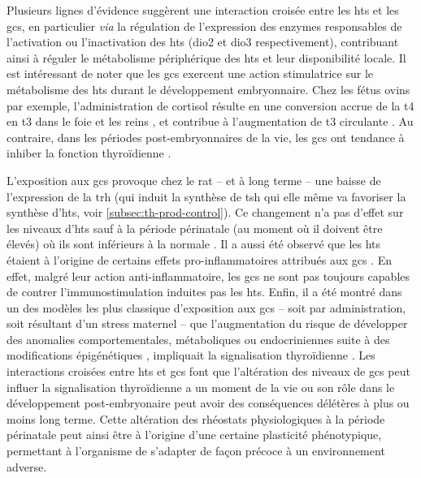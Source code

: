 \documentclass[../main.tex]{subfiles}
\begin{document}
Plusieurs lignes d'évidence suggèrent une interaction croisée entre les \glspl{ht} et les \glspl{gc}, en particulier \textit{via} la régulation de l'expression des enzymes responsables de l'activation ou l'inactivation des \glspl{ht} (\gls{dio2} et \gls{dio3} respectivement), contribuant ainsi à réguler le métabolisme périphérique des \glspl{ht} et leur disponibilité locale.
Il est intéressant de noter que les \glspl{gc} exercent une action stimulatrice sur le métabolisme des \glspl{ht} durant le développement embryonnaire.
Chez les fétus ovins par exemple, l'administration de cortisol résulte en une conversion accrue de la \gls{t4} en \gls{t3} dans le foie et les reins \citep{Wu1978}, et contribue à l'augmentation de \gls{t3} circulante \citep{Darras1996}.
Au contraire, dans les périodes post-embryonnaires de la vie, les \glspl{gc} ont tendance à inhiber la fonction thyroïdienne \citep{Chopra1975,Decuypere1983,Bianco1987}.
\par
L'exposition aux \glspl{gc} provoque chez le rat – et à long terme – une baisse de l'expression de la \gls{trh} (qui induit la synthèse de \gls{tsh} qui elle même va favoriser la synthèse d'\glspl{ht}, voir \autoref{subsec:th-prod-control}).
Ce changement n'a pas d'effet sur les niveaux d'\glspl{ht} sauf à la période périnatale (au moment où il doivent être élevés) où ils sont inférieurs à la normale \citep{Carbone2012}.
Il a aussi été observé que les \glspl{ht} étaient à l'origine de certains effets pro-inflammatoires attribués aux \glspl{gc} \citep{Montesinos2012}.
En effet, malgré leur action anti-inflammatoire, les \glspl{gc} ne sont pas toujours capables de contrer l'immunostimulation induites pas les \glspl{ht}.
Enfin, il a été montré dans un des modèles les plus classique d'exposition aux \glspl{gc} – soit par administration, soit résultant d'un stress maternel – que l'augmentation du risque de développer des anomalies comportementales, métaboliques ou endocriniennes suite à des modifications épigénétiques \cite{Weaver2004}, impliquait la signalisation thyroïdienne \citep{Hellstrom2012}.
Les interactions croisées entre \glspl{ht} et \glspl{gc} font que l'altération des niveaux de \glspl{gc} peut influer la signalisation thyroïdienne a un moment de la vie ou son rôle dans le développement post-embryonaire peut avoir des conséquences délétères à plus ou moins long terme.
Cette altération des rhéostats physiologiques à la période périnatale peut ainsi être à l'origine d'une certaine plasticité phénotypique, permettant à l'organisme de s'adapter de façon précoce à un environnement adverse.
\end{document}
